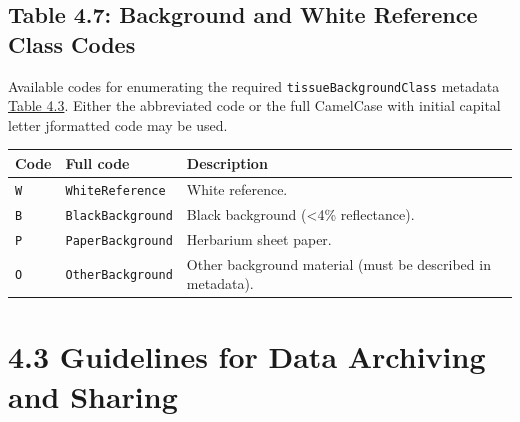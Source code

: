 \documentclass[
  letterpaper,
  DIV=11,
  numbers=noendperiod]{scrreprt}
\begin{document}
\subsection{Table 4.7: Background and White Reference Class
Codes}\label{tbl-4-7}

Available codes for enumerating the required
\texttt{tissueBackgroundClass} metadata \hyperref[tbl-4-3]{Table 4.3}.
Either the abbreviated code or the full CamelCase with initial capital
letter jformatted code may be used.

\begin{longtable}[]{@{}
  >{\raggedright\arraybackslash}p{}
  >{\raggedright\arraybackslash}p{}
  >{\raggedright\arraybackslash}p{}@{}}
\toprule\noalign{}
\begin{minipage}[b]{\linewidth}\raggedright
Code
\end{minipage} & \begin{minipage}[b]{\linewidth}\raggedright
Full code
\end{minipage} & \begin{minipage}[b]{\linewidth}\raggedright
Description
\end{minipage} \\
\midrule\noalign{}
\endhead
\bottomrule\noalign{}
\endlastfoot
\texttt{W} & \texttt{WhiteReference} & White reference. \\
\texttt{B} & \texttt{BlackBackground} & Black background (\textless4\%
reflectance). \\
\texttt{P} & \texttt{PaperBackground} & Herbarium sheet paper. \\
\texttt{O} & \texttt{OtherBackground} & Other background material (must
be described in metadata). \\
\end{longtable}

\section{4.3 Guidelines for Data Archiving and
Sharing}\label{section4-3}
\end{document}
